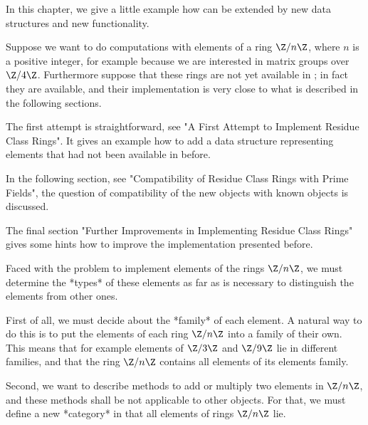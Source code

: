 

In this chapter, we give a little example how {\GAP} can be extended
by new data structures and new functionality.

Suppose we want to do computations with elements of a ring $\Z/n\Z$,
where $n$ is a positive integer,
for example because we are interested in matrix groups over $\Z/4\Z$.
Furthermore suppose that these rings are not yet available in {\GAP};
in fact they are available, and their implementation is very close to
what is described in the following sections.

The first attempt is straightforward,
see "A First Attempt to Implement Residue Class Rings".
It gives an example how to add a data structure representing elements
that had not been available in {\GAP} before.

In the following section,
see "Compatibility of Residue Class Rings with Prime Fields",
the question of compatibility of the new objects with known objects is
discussed.

The final section
"Further Improvements in Implementing Residue Class Rings"
gives some hints how to improve the implementation presented before.


Faced with the problem to implement elements of the rings $\Z/n\Z$,
we must determine the *types* of these elements as far as is necessary to
distinguish the elements from other ones.

First of all, we must decide about the *family* of each element.
A natural way to do this is to put the elements of each ring $\Z/n\Z$
into a family of their own.
This means that for example elements of $\Z/3\Z$ and $\Z/9\Z$ lie
in different families,
and that the ring $\Z/n\Z$ contains all elements of its elements family.

Second, we want to describe methods to add or multiply two elements in
$\Z/n\Z$,
and these methods shall be not applicable to other {\GAP} objects.
For that, we must define a new *category* in that all elements of rings
$\Z/n\Z$ lie.


